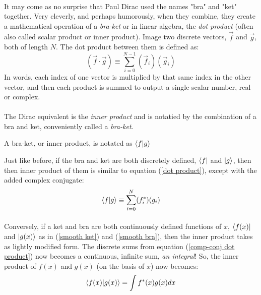 \documentclass[12pt,letterpaper]{book}
\begin{document}
\paragraph*{}It may come as no surprise that Paul Dirac used the names "bra" and "ket" together. Very cleverly, and perhaps humorously, when they combine, they create a mathematical operation of a \textit{bra-ket} or in linear algebra, the \textit{dot product} (often also called scalar product or inner product). Image two discrete vectors, 
$\vec{f}$ and $\vec{g}$, both of length $N$. The dot product between them is defined as:
\begin{equation}
\label{dot product}
(\vec{f} \cdot \vec{g}) \equiv \sum_{i=0}^{N-1} (\vec{f}_i)(\vec{g}_i)
\end{equation}
In words, each index of one vector is multiplied by that same index in the other vector, and then each product is summed to output a single scalar number, real or complex.
\paragraph*{}The Dirac equivalent is the \textit{inner product} and is notatied by the combination of a bra and ket, conveniently called a \textit{bra-ket}.
\begin{center}
A bra-ket, or inner product, is notated as $\braket{f}{g}$
\end{center}
Just like before, if the bra and ket are both discretely defined, $\bra{f}$ and $\ket{g}$, then then inner product of them is similar to equation (\ref{dot product}), except with the added complex conjugate:
\begin{equation}
\label{comp-conj dot product}
\braket{f}{g} \equiv \sum_{i=0}^N (f^*_i) (g_i)
\end{equation}
\paragraph*{}Conversely, if a ket and bra are both continuously defined functions of $x$, $\bra{f(x)}$ and $\ket{g(x)}$ as in (\ref{smooth ket}) and (\ref{smooth bra}), then the inner product takes as lightly modified form. The discrete sums from equation (\ref{comp-conj dot product}) now becomes a continuous, infinite sum, \textit{an integral}! So, the inner product of $f(x)$ and $g(x)$ (on the basis of $x$) now becomes:
\begin{equation}
\label{bra-ket}
\braket{f(x)}{g(x)} = \int f^*(x) g(x) dx
\end{equation}
\end{document}
